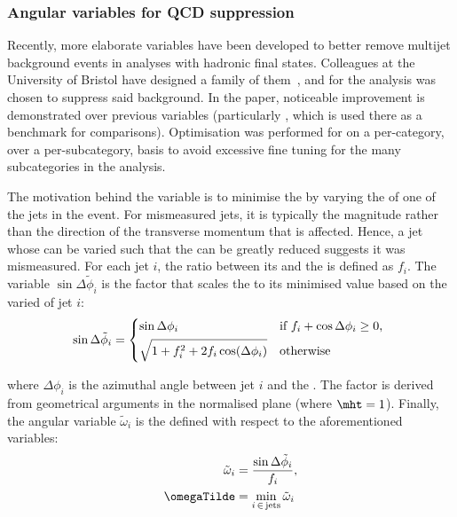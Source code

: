

\subsubsection{Angular variables for QCD suppression}
\label{subsubsec:htoinv_ang_var_optimisation}

Recently, more elaborate variables have been developed to better remove multijet background events in analyses with hadronic final states. Colleagues at the University of Bristol have designed a family of them~\cite{Sakuma:2018xrq}, and for the analysis \omegaTilde was chosen to suppress said background. In the paper, noticeable improvement is demonstrated over previous variables (particularly \biasedDPhi, which is used there as a benchmark for comparisons). Optimisation was performed for \omegaTilde on a per-category, over a per-subcategory, basis to avoid excessive fine tuning for the many subcategories in the analysis.

The motivation behind the variable \omegaTilde is to minimise the \mht by varying the \pt of one of the \glspl{jet} in the event. For mismeasured \glspl{jet}, it is typically the magnitude rather than the direction of the transverse momentum that is affected. Hence, a \gls{jet} whose \pt can be varied such that the \mht can be greatly reduced suggests it was mismeasured. For each jet $i$, the ratio between its \pt and the \mht is defined as $f_i$. The variable $\sin\Delta\tilde{\phi}_i$ is the factor that scales the \mht to its minimised value based on the varied \pt of jet $i$:
\begin{align}
\sin\Delta\tilde{\phi}_i = \begin{dcases*}
\sin\Delta\phi_i & if $f_i + \cos\Delta\phi_i \geq 0$, \\
\sqrt{1 + f_i^2 + 2 f_i \cos(\Delta\phi_i)} & otherwise\\
\end{dcases*}
\end{align}

where $\Delta\phi_i$ is the azimuthal angle between \gls{jet} $i$ and the \htvecmiss. The factor is derived from geometrical arguments in the normalised \pt plane (where $\mht = \text{1}$). Finally, the angular variable $\tilde{\omega}_i$ is the defined with respect to the aforementioned variables:
\begin{equation}
    \begin{aligned}
\tilde{\omega}_i &= \frac{ \sin\Delta\tilde{\phi}_i }{ f_i },\\
\omegaTilde &= \min_{i \, \in \, \mathrm{jets}} \tilde{\omega}_i
    \end{aligned}
\end{equation}

